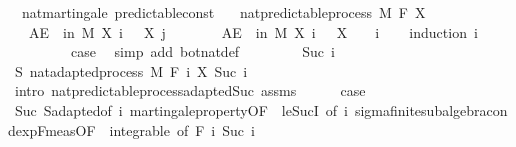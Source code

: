 \begin{isabellebody}
\begin{isamarkuptext}
\end{isamarkuptext}\isamarkuptrue%
\isamarkupfalse%
\ {\isacharparenleft}{\kern0pt}\ nat{\isacharunderscore}{\kern0pt}martingale{\isacharparenright}{\kern0pt}\ predictable{\isacharunderscore}{\kern0pt}const{\isacharcolon}{\kern0pt}\isanewline
\ \ \ {\isachardoublequoteopen}nat{\isacharunderscore}{\kern0pt}predictable{\isacharunderscore}{\kern0pt}process\ M\ F\ X{\isachardoublequoteclose}\isanewline
\ \ \ {\isachardoublequoteopen}AE\ {\isasymxi}\ in\ M{\isachardot}{\kern0pt}\ X\ i\ {\isasymxi}\ {\isacharequal}{\kern0pt}\ X\ j\ {\isasymxi}{\isachardoublequoteclose}\isanewline
%
\isadelimproof
%
\endisadelimproof
%
\isatagproof
{}\isamarkupfalse%
\ {\isacharminus}{\kern0pt}\isanewline
\ \ \isamarkupfalse%
\ {\isacharasterisk}{\kern0pt}{\isacharcolon}{\kern0pt}\ {\isachardoublequoteopen}AE\ {\isasymxi}\ in\ M{\isachardot}{\kern0pt}\ X\ i\ {\isasymxi}\ {\isacharequal}{\kern0pt}\ X\ {}\ {\isasymxi}{\isachardoublequoteclose}\ \ i\isanewline
\ \ \isamarkupfalse%
\ {\isacharparenleft}{\kern0pt}induction\ i{\isacharparenright}{\kern0pt}\isanewline
\ \ \ \ \isamarkupfalse%
\ {}\isanewline
\ \ \ \ \isamarkupfalse%
\ \isamarkupfalse%
\ {\isacharquery}{\kern0pt}case\ \isamarkupfalse%
\ {\isacharparenleft}{\kern0pt}simp\ add{\isacharcolon}{\kern0pt}\ bot{\isacharunderscore}{\kern0pt}nat{\isacharunderscore}{\kern0pt}def{\isacharparenright}{\kern0pt}\isanewline
\ \ \isamarkupfalse%
\isanewline
\ \ \ \ \isamarkupfalse%
\ {\isacharparenleft}{\kern0pt}Suc\ i{\isacharparenright}{\kern0pt}\isanewline
\ \ \ \ \isamarkupfalse%
\ S{\isacharcolon}{\kern0pt}\ nat{\isacharunderscore}{\kern0pt}adapted{\isacharunderscore}{\kern0pt}process\ M\ F\ {\isachardoublequoteopen}{\isasymlambda}i{\isachardot}{\kern0pt}\ X\ {\isacharparenleft}{\kern0pt}Suc\ i{\isacharparenright}{\kern0pt}{\isachardoublequoteclose}\ \isamarkupfalse%
\ {\isacharparenleft}{\kern0pt}intro\ nat{\isacharunderscore}{\kern0pt}predictable{\isacharunderscore}{\kern0pt}process{\isachardot}{\kern0pt}adapted{\isacharunderscore}{\kern0pt}Suc\ assms{\isacharparenright}{\kern0pt}\isanewline
\ \ \ \ \isamarkupfalse%
\ {\isacharquery}{\kern0pt}case\ \isamarkupfalse%
\ Suc\ S{\isachardot}{\kern0pt}adapted{\isacharbrackleft}{\kern0pt}of\ i{\isacharbrackright}{\kern0pt}\ martingale{\isacharunderscore}{\kern0pt}property{\isacharbrackleft}{\kern0pt}OF\ {\isacharunderscore}{\kern0pt}\ le{\isacharunderscore}{\kern0pt}SucI{\isacharcomma}{\kern0pt}\ of\ i{\isacharbrackright}{\kern0pt}\ sigma{\isacharunderscore}{\kern0pt}finite{\isacharunderscore}{\kern0pt}subalgebra{\isachardot}{\kern0pt}cond{\isacharunderscore}{\kern0pt}exp{\isacharunderscore}{\kern0pt}F{\isacharunderscore}{\kern0pt}meas{\isacharbrackleft}{\kern0pt}OF\ {\isacharunderscore}{\kern0pt}\ integrable{\isacharcomma}{\kern0pt}\ of\ {\isachardoublequoteopen}F\ i{\isachardoublequoteclose}\ {\isachardoublequoteopen}Suc\ i{\isachardoublequoteclose}{\isacharbrackright}{\kern0pt}\ \isamarkupfalse%

\end{isabellebody}
